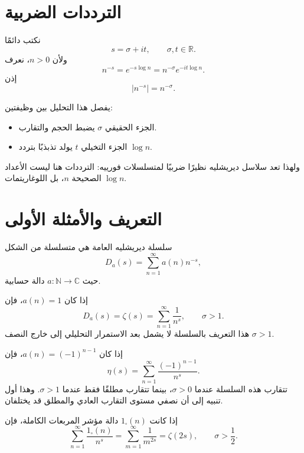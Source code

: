 \section{الترددات الضربية}

نكتب دائمًا
\[
s=\sigma+it,
\qquad \sigma,t\in\mathbb{R}.
\]
ولأن \(n>0\)، نعرف
\[
n^{-s}=e^{-s\log n}=n^{-\sigma}e^{-it\log n}.
\]
إذن
\[
|n^{-s}|=n^{-\sigma}.
\]

يفصل هذا التحليل بين وظيفتين:

\begin{itemize}
  \item الجزء الحقيقي \(\sigma\) يضبط الحجم والتقارب.
  \item الجزء التخيلي \(t\) يولد تذبذبًا بتردد \(\log n\).
\end{itemize}

ولهذا تعد سلاسل ديريشليه نظيرًا ضربيًا لمتسلسلات فورييه: الترددات هنا
ليست الأعداد الصحيحة \(n\)، بل اللوغاريتمات \(\log n\).

\section{التعريف والأمثلة الأولى}

\begin{definition}
سلسلة ديريشليه العامة هي متسلسلة من الشكل
\[
D_a(s)=\sum_{n=1}^{\infty}a(n)n^{-s},
\]
حيث \(a:\mathbb{N}\to\mathbb{C}\) دالة حسابية.
\end{definition}

\begin{example}
إذا كان \(a(n)=1\)، فإن
\[
D_a(s)=\zeta(s)=\sum_{n=1}^{\infty}\frac1{n^s},
\qquad \sigma>1.
\]
هذا التعريف بالسلسلة لا يشمل بعد الاستمرار التحليلي إلى خارج النصف
\(\sigma>1\).
\end{example}

\begin{example}
إذا كان \(a(n)=(-1)^{n-1}\)، فإن
\[
\eta(s)=\sum_{n=1}^{\infty}\frac{(-1)^{n-1}}{n^s}.
\]
تتقارب هذه السلسلة عندما \(\sigma>0\)، بينما تتقارب مطلقًا فقط عندما
\(\sigma>1\). وهذا أول تنبيه إلى أن نصفي مستوى التقارب العادي والمطلق قد
يختلفان.
\end{example}

\begin{example}
إذا كانت \(1_{\square}(n)\) دالة مؤشر المربعات الكاملة، فإن
\[
\sum_{n=1}^{\infty}\frac{1_{\square}(n)}{n^s}
=
\sum_{m=1}^{\infty}\frac1{m^{2s}}
=
\zeta(2s),
\qquad \sigma>\frac12.
\]
\end{example}

